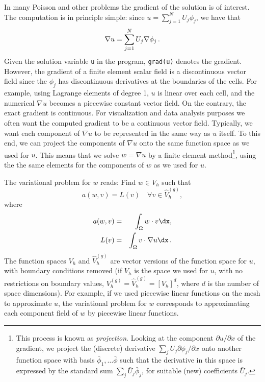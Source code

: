 In many Poisson and other problems the gradient of the solution is
of interest. The computation is in principle simple:
since
$u = \sum_{j=1}^N U_j \phi_j$, we have that
\[ \nabla u = \sum_{j=1}^N U_j \nabla \phi_j\thinspace .\]
Given the solution variable {\fontsize{12pt}{12pt}\texttt{u}} in the program, {\fontsize{12pt}{12pt}\texttt{grad(u)}} denotes
the gradient. However, the gradient of a finite element scalar field
is a discontinuous vector field
since the $\phi_j$ has discontinuous derivatives at the boundaries of
the cells. For example, using Lagrange elements of degree 1, $u$ is
linear over each cell, and the numerical $\nabla u$ becomes a piecewise
constant vector field. On the contrary,
the exact gradient is continuous.
For visualization and data analysis purposes
we often want the computed
gradient to be a continuous vector field. Typically,
we want each component of $\nabla u$ to be represented in the same
way as $u$ itself. To this end, we can project the components
of $\nabla u$ onto the
same function space as we used for $u$.
This means that we solve $w = \nabla u$ by a finite element 
method\footnote{This process is known as \emph{projection}.
Looking at the component $\partial u/\partial x$ of the gradient, we project
the (discrete) derivative
$\sum_jU_j{\partial \phi_j/\partial x}$ onto another function space
with basis $\bar\phi_1,\ldots\bar\phi$ such that the derivative in
this space is expressed by the standard sum 
$\sum_j\bar U_j\bar \phi_j$, for suitable (new) 
coefficients $\bar U_j$.},
using the the same elements for the components of $w$ as we used for $u$.

The variational problem for $w$ reads: Find  $w\in V_h$ such that
\begin{equation}
a(w, v) = L(v)\quad\forall v\in \hat{V}_h^{(g)},
\end{equation}
where
\begin{eqnarray}
a(w, v) &=& \int_\Omega w\cdot v\dx,\\
L(v) &=& \int_\Omega v\cdot \nabla u\dx\langtangenep
\end{eqnarray}
The function spaces $V_h$ and $\hat{V}_h^{(g)}$ are
vector versions of the function space for $u$, with
boundary conditions removed (if $V_h$ is the 
space we used for $u$, with no restrictions
on boundary values, $ V^{(g)}_h = \hat{V}_h^{(g)} = [V_h]^d$, where
$d$ is the number of space dimensions).
For example, if we used piecewise linear functions on the mesh to
approximate $u$, the variational problem for $w$ corresponds to
approximating each component field of $w$ by piecewise linear functions.

